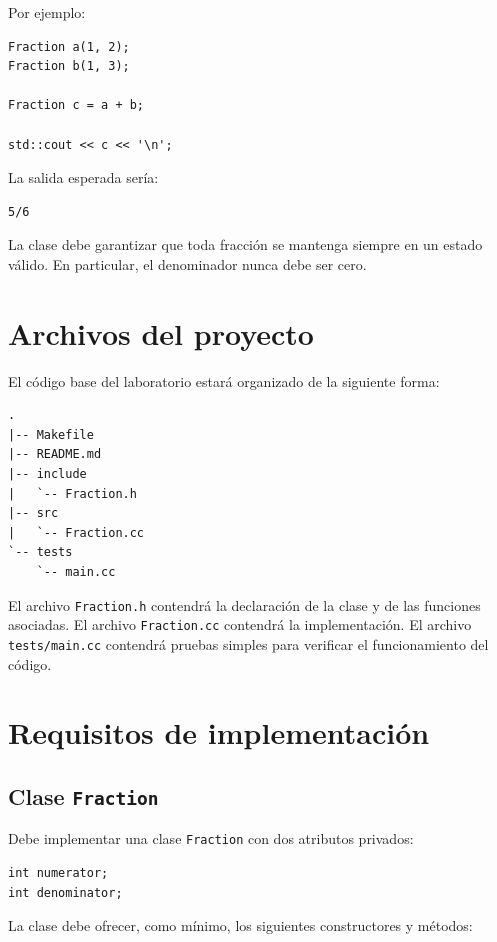 \documentclass[11pt,a4paper]{article}
\begin{document}
Por ejemplo:

\begin{lstlisting}
Fraction a(1, 2);
Fraction b(1, 3);

Fraction c = a + b;

std::cout << c << '\n';
\end{lstlisting}

La salida esperada sería:

\begin{lstlisting}[language={}]
5/6
\end{lstlisting}

La clase debe garantizar que toda fracción se mantenga siempre en un estado válido. En particular, el denominador nunca debe ser cero.

\section{Archivos del proyecto}

El código base del laboratorio estará organizado de la siguiente forma:

\begin{lstlisting}[language={}]
.
|-- Makefile
|-- README.md
|-- include
|   `-- Fraction.h
|-- src
|   `-- Fraction.cc
`-- tests
    `-- main.cc
\end{lstlisting}

El archivo \lstinline|Fraction.h| contendrá la declaración de la clase y de las funciones asociadas. El archivo \lstinline|Fraction.cc| contendrá la implementación. El archivo \lstinline|tests/main.cc| contendrá pruebas simples para verificar el funcionamiento del código.

\section{Requisitos de implementación}

\subsection{Clase \texttt{Fraction}}

Debe implementar una clase \lstinline|Fraction| con dos atributos privados:

\begin{lstlisting}
int numerator;
int denominator;
\end{lstlisting}

La clase debe ofrecer, como mínimo, los siguientes constructores y métodos:
\end{document}
